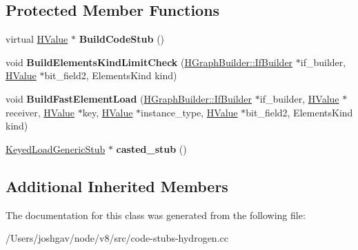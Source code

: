 \subsection*{Protected Member Functions}
\begin{DoxyCompactItemize}
\item 
virtual \hyperlink{classv8_1_1internal_1_1_h_value}{H\+Value} $\ast$ {\bfseries Build\+Code\+Stub} ()\hypertarget{classv8_1_1internal_1_1_code_stub_graph_builder_3_01_keyed_load_generic_stub_01_4_aec62f80b6aa80c7c03d47ff8e81c4ea2}{}\label{classv8_1_1internal_1_1_code_stub_graph_builder_3_01_keyed_load_generic_stub_01_4_aec62f80b6aa80c7c03d47ff8e81c4ea2}

\item 
void {\bfseries Build\+Elements\+Kind\+Limit\+Check} (\hyperlink{classv8_1_1internal_1_1_h_graph_builder_1_1_if_builder}{H\+Graph\+Builder\+::\+If\+Builder} $\ast$if\+\_\+builder, \hyperlink{classv8_1_1internal_1_1_h_value}{H\+Value} $\ast$bit\+\_\+field2, Elements\+Kind kind)\hypertarget{classv8_1_1internal_1_1_code_stub_graph_builder_3_01_keyed_load_generic_stub_01_4_a0a528a2dd74d7ee9b798222b658b8624}{}\label{classv8_1_1internal_1_1_code_stub_graph_builder_3_01_keyed_load_generic_stub_01_4_a0a528a2dd74d7ee9b798222b658b8624}

\item 
void {\bfseries Build\+Fast\+Element\+Load} (\hyperlink{classv8_1_1internal_1_1_h_graph_builder_1_1_if_builder}{H\+Graph\+Builder\+::\+If\+Builder} $\ast$if\+\_\+builder, \hyperlink{classv8_1_1internal_1_1_h_value}{H\+Value} $\ast$receiver, \hyperlink{classv8_1_1internal_1_1_h_value}{H\+Value} $\ast$key, \hyperlink{classv8_1_1internal_1_1_h_value}{H\+Value} $\ast$instance\+\_\+type, \hyperlink{classv8_1_1internal_1_1_h_value}{H\+Value} $\ast$bit\+\_\+field2, Elements\+Kind kind)\hypertarget{classv8_1_1internal_1_1_code_stub_graph_builder_3_01_keyed_load_generic_stub_01_4_a978e3de8fcac8d5b029e50180d987026}{}\label{classv8_1_1internal_1_1_code_stub_graph_builder_3_01_keyed_load_generic_stub_01_4_a978e3de8fcac8d5b029e50180d987026}

\item 
\hyperlink{classv8_1_1internal_1_1_keyed_load_generic_stub}{Keyed\+Load\+Generic\+Stub} $\ast$ {\bfseries casted\+\_\+stub} ()\hypertarget{classv8_1_1internal_1_1_code_stub_graph_builder_3_01_keyed_load_generic_stub_01_4_a9098de215df8d6832950d22690c88729}{}\label{classv8_1_1internal_1_1_code_stub_graph_builder_3_01_keyed_load_generic_stub_01_4_a9098de215df8d6832950d22690c88729}

\end{DoxyCompactItemize}
\subsection*{Additional Inherited Members}


The documentation for this class was generated from the following file\+:\begin{DoxyCompactItemize}
\item 
/\+Users/joshgav/node/v8/src/code-\/stubs-\/hydrogen.\+cc\end{DoxyCompactItemize}
